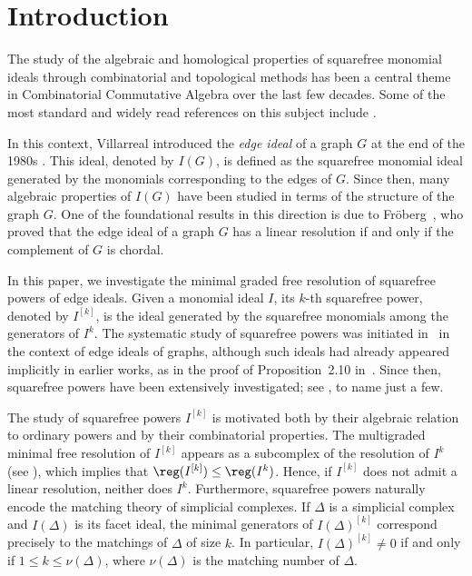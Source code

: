 \documentclass[12pt]{amsart}
\begin{document}
\section*{Introduction}

The study of the algebraic and homological properties of squarefree monomial ideals through combinatorial and topological methods has been a central theme in Combinatorial Commutative Algebra over the last few decades. Some of the most standard and widely read references on this subject include \cite{BH, kozlov2007combinatorial, miller2004combinatorial, Villarreal}. 

In this context, Villarreal introduced the \textit{edge ideal} of a graph $G$ at the end of the 1980s \cite{Villarreal1990}. This ideal, denoted by $I(G)$, is defined as the squarefree monomial ideal generated by the monomials corresponding to the edges of $G$. Since then, many algebraic properties of $I(G)$ have been studied in terms of the structure of the graph $G$. One of the foundational results in this direction is due to Fr\"oberg~\cite{Froberg1990}, who proved that the edge ideal of a graph $G$ has a linear resolution if and only if the complement of $G$ is chordal.

In this paper, we investigate the minimal graded free resolution of squarefree powers of edge ideals. Given a monomial ideal $I$, its $k$-th squarefree power, denoted by $I^{[k]}$, is the ideal generated by the squarefree monomials among the generators of $I^k$. The systematic study of squarefree powers was initiated in~\cite{BHZ} in the context of edge ideals of graphs, although such ideals had already appeared implicitly in earlier works, as in the proof of Proposition~2.10 in~\cite{JZ}. Since then, squarefree powers have been extensively investigated; see \cite{CFL, das2026regularitysquarefreepowersedge, EHHM2, EH, Kamalesh1, KAMBERI2026240, tyoungcomplexessquarefreepowers, SEYEDFAKHARI2024107488}, to name just a few.

The study of squarefree powers $I^{[k]}$ is motivated both by their algebraic relation to ordinary powers and by their combinatorial properties. The multigraded minimal free resolution of $I^{[k]}$ appears as a subcomplex of the resolution of $I^k$ (see \cite[Lemma~4.4]{HerzogHibiZheng}), which implies that $\reg(I^{[k]}) \leq \reg(I^k)$. Hence, if $I^{[k]}$ does not admit a linear resolution, neither does $I^k$. Furthermore, squarefree powers naturally encode the matching theory of simplicial complexes. If $\Delta$ is a simplicial complex and $I(\Delta)$ is its facet ideal, the minimal generators of $I(\Delta)^{[k]}$ correspond precisely to the matchings of $\Delta$ of size $k$. In particular, $I(\Delta)^{[k]} \neq 0$ if and only if $1 \leq k \leq \nu(\Delta)$, where $\nu(\Delta)$ is the matching number of $\Delta$.
\end{document}
